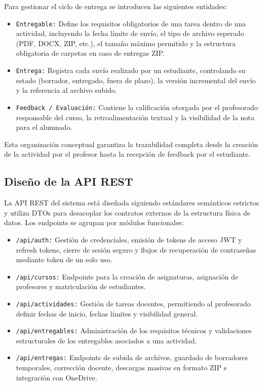 Para gestionar el ciclo de entrega se introducen las siguientes entidades:
\begin{itemize}
    \item \texttt{Entregable:} Define los requisitos obligatorios de una tarea dentro de una actividad, incluyendo la fecha l\'imite de env\'io, el tipo de archivo esperado (PDF, DOCX, ZIP, etc.), el tama\~no m\'aximo permitido y la estructura obligatoria de carpetas en caso de entregas ZIP.
    \item \texttt{Entrega:} Registra cada env\'io realizado por un estudiante, controlando su estado (borrador, entregado, fuera de plazo), la versi\'on incremental del env\'io y la referencia al archivo subido.
    \item \texttt{Feedback / Evaluaci\'on:} Contiene la calificaci\'on otorgada por el profesorado responsable del curso, la retroalimentaci\'on textual y la visibilidad de la nota para el alumnado.
\end{itemize}

Esta organizaci\'on conceptual garantiza la trazabilidad completa desde la creaci\'on de la actividad por el profesor hasta la recepci\'on de feedback por el estudiante.

\subsection{Dise\~no de la API REST}

La API REST del sistema est\'a dise\~nada siguiendo est\'andares sem\'anticos estrictos y utiliza DTOs para desacoplar los contratos externos de la estructura f\'isica de datos. Los endpoints se agrupan por m\'odulos funcionales:
\begin{itemize}
    \item \texttt{/api/auth:} Gesti\'on de credenciales, emisi\'on de tokens de acceso JWT y refresh tokens, cierre de sesi\'on seguro y flujos de recuperaci\'on de contrase\~nas mediante token de un solo uso.
    \item \texttt{/api/cursos:} Endpoints para la creaci\'on de asignaturas, asignaci\'on de profesores y matriculaci\'on de estudiantes.
    \item \texttt{/api/actividades:} Gesti\'on de tareas docentes, permitiendo al profesorado definir fechas de inicio, fechas l\'imites y visibilidad general.
    \item \texttt{/api/entregables:} Administraci\'on de los requisitos t\'ecnicos y validaciones estructurales de los entregables asociados a una actividad.
    \item \texttt{/api/entregas:} Endpoints de subida de archivos, guardado de borradores temporales, correcci\'on docente, descargas masivas en formato ZIP e integraci\'on con OneDrive.
\end{itemize}

